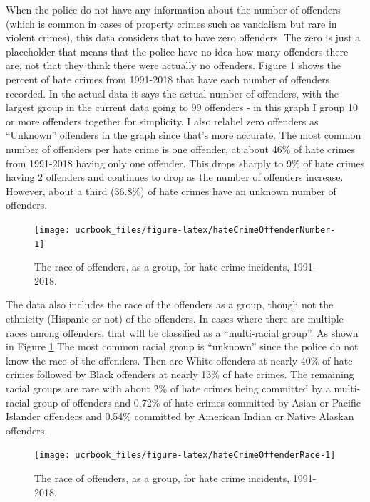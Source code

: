 \documentclass[
  12pt,
  openany]{book}
\begin{document}
When the police do not have any information about the number of offenders (which is common in cases of property crimes such as vandalism but rare in violent crimes), this data considers that to have zero offenders. The zero is just a placeholder that means that the police have no idea how many offenders there are, not that they think there were actually no offenders. Figure \ref{fig:hateCrimeOffenderNumber} shows the percent of hate crimes from 1991-2018 that have each number of offenders recorded. In the actual data it says the actual number of offenders, with the largest group in the current data going to 99 offenders - in this graph I group 10 or more offenders together for simplicity. I also relabel zero offenders as ``Unknown'' offenders in the graph since that's more accurate. The most common number of offenders per hate crime is one offender, at about 46\% of hate crimes from 1991-2018 having only one offender. This drops sharply to 9\% of hate crimes having 2 offenders and continues to drop as the number of offenders increase. However, about a third (36.8\%) of hate crimes have an unknown number of offenders.

\begin{figure}

{\centering \texttt{[image: ucrbook\_files/figure-latex/hateCrimeOffenderNumber-1]} 

}

\caption{The race of offenders, as a group, for hate crime incidents, 1991-2018.}\label{fig:hateCrimeOffenderNumber}
\end{figure}

The data also includes the race of the offenders as a group, though not the ethnicity (Hispanic or not) of the offenders. In cases where there are multiple races among offenders, that will be classified as a ``multi-racial group''. As shown in Figure \ref{fig:hateCrimeOffenderNumber} The most common racial group is ``unknown'' since the police do not know the race of the offenders. Then are White offenders at nearly 40\% of hate crimes followed by Black offenders at nearly 13\% of hate crimes. The remaining racial groups are rare with about 2\% of hate crimes being committed by a multi-racial group of offenders and 0.72\% of hate crimes committed by Asian or Pacific Islander offenders and 0.54\% committed by American Indian or Native Alaskan offenders.

\begin{figure}

{\centering \texttt{[image: ucrbook\_files/figure-latex/hateCrimeOffenderRace-1]} 

}

\caption{The race of offenders, as a group, for hate crime incidents, 1991-2018.}\label{fig:hateCrimeOffenderRace}
\end{figure}
\end{document}
